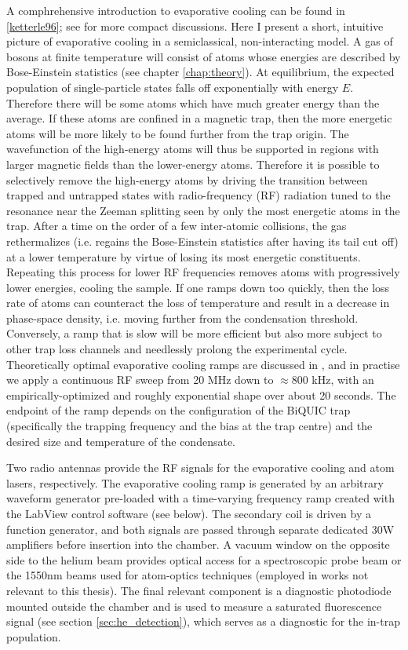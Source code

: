 	A comphrehensive introduction to evaporative cooling can be found in \ref{ketterle96}; see \cite{FootAtomic,PethickSmith} for more compact discussions. 
	Here I present a short, intuitive picture of evaporative cooling in a semiclassical, non-interacting model. 
	A gas of bosons at finite temperature will consist of atoms whose energies are described by Bose-Einstein statistics (see chapter \ref{chap:theory}). 
	At equilibrium, the expected population of single-particle states falls off exponentially with energy $E$. 
	Therefore there will be some atoms which have much greater energy than the average. 
	If these atoms are confined in a magnetic trap, then the more energetic atoms will be more likely to be found further from the trap origin.
	The wavefunction of the high-energy atoms will thus be supported in regions with larger magnetic fields than the lower-energy atoms.
	Therefore it is possible to selectively remove the high-energy atoms by driving the transition between trapped and untrapped states with radio-frequency (RF) radiation tuned to the resonance near the Zeeman splitting seen by only the most energetic atoms in the trap.
	After a time on the order of a few inter-atomic collisions, the gas rethermalizes (i.e. regains the Bose-Einstein statistics after having its tail cut off) at a lower temperature by virtue of losing its most energetic constituents.
	Repeating this process for lower RF frequencies removes atoms with progressively lower energies, cooling the sample.
	If one ramps down too quickly, then the loss rate of atoms can counteract the loss of temperature and result in a decrease in phase-space density, i.e. moving further from the condensation threshold.
	Conversely, a ramp that is slow will be more efficient but also more subject to other trap loss channels and needlessly prolong the experimental cycle.
	Theoretically optimal evaporative cooling ramps are discussed in \cite{Ketterle96}, and in practise we apply a continuous RF sweep from 20 MHz down to $\approx800$ kHz, with an empirically-optimized and roughly exponential shape over about 20 seconds.
	The endpoint of the ramp depends on the configuration of the BiQUIC trap (specifically the trapping frequency and the bias at the trap centre) and the desired size and temperature of the condensate. 
	


	Two radio antennas provide the RF signals for the evaporative cooling and atom lasers, respectively.
	The evaporative cooling ramp is generated by an arbitrary waveform generator pre-loaded with a time-varying frequency ramp created with the LabView control software (see below).
	The secondary coil is driven by a function generator, and both signals are passed through separate dedicated 30W amplifiers before insertion into the chamber.
	A vacuum window on the opposite side to the helium beam provides optical access for a spectroscopic probe beam or the 1550nm beams used for atom-optics techniques (employed in works not relevant to this thesis).
	The final relevant component is a diagnostic photodiode mounted outside the chamber and is used to measure a saturated fluorescence signal (see section \ref{sec:he_detection}), which serves as a diagnostic for the in-trap population.



